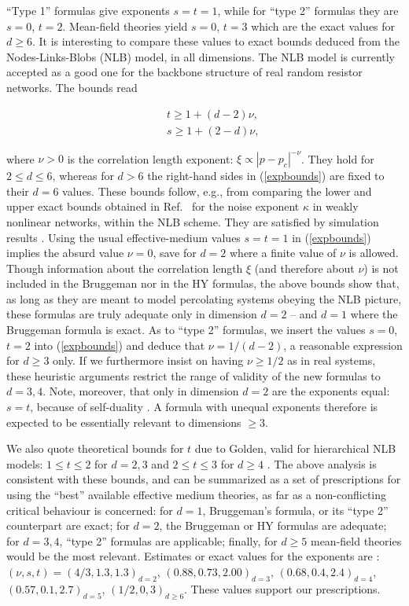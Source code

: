 ``Type 1'' formulas give exponents $s=t=1$, while for ``type 2''
formulas they are $s=0$, $t=2$. Mean-field theories yield $s=0$, $t=3$
which are the exact values for $d\geq 6$. It is interesting to
compare these values to exact bounds deduced from the
Nodes-Links-Blobs (NLB) model, in all dimensions. The NLB model is
currently accepted as a good one for the backbone structure of real
random resistor networks\cite{STAU92}. The bounds read
\begin{mathletters}
\label{expbounds}
\begin{eqnarray}
&&t\ge 1+(d-2)\nu,\\
&&s\ge 1+(2-d)\nu,
\end{eqnarray}
\end{mathletters}
where $\nu>0$ is the correlation length exponent: $\xi\propto
|p-p_c|^{-\nu}$. They hold for $2\leq d\leq 6$, whereas for $d>6$ the
right-hand sides in (\ref{expbounds}) are fixed to their $d=6$
values. These bounds follow, e.g., from comparing the lower and upper
exact bounds obtained in Ref.\ \cite{WRIG86} for the noise exponent
$\kappa$ in weakly nonlinear networks, within the NLB scheme. They
are satisfied by simulation results \cite{WRIG86}.
Using the usual
effective-medium values $s=t=1$ in (\ref{expbounds}) implies the
absurd value $\nu=0$, save for $d=2$ where a finite value of $\nu$ is
allowed. Though information about the correlation length $\xi$ (and
therefore about $\nu$) is not included in the Bruggeman nor in the HY
formulas, the above bounds show that, as long as they are meant to
model percolating systems obeying the NLB picture, these formulas are
truly adequate only in dimension $d=2$ -- and $d=1$ where the Bruggeman
formula is exact. As to ``type 2'' formulas, we insert the
values $s=0$, $t=2$ into (\ref{expbounds}) and deduce that
$\nu=1/(d-2)$, a reasonable expression for $d\geq 3$ only. If we
furthermore insist on having $\nu\geq 1/2$ as in real systems, these
heuristic arguments restrict the range of validity of the new formulas
to $d=3,4$. Note, moreover, that only in dimension $d=2$ are the
exponents equal: $s=t$, because of self-duality \cite{STRA77}. A
formula with unequal exponents therefore is expected to be essentially
relevant to dimensions $\geq 3$.

We also quote theoretical bounds for $t$ due to Golden, valid for
hierarchical NLB models: $1\leq t\leq 2$ for $d=2,3$ and $2\leq t\leq
3$ for $d\geq 4$ \cite{GOLD90}. The above analysis is consistent with
these bounds, and can be summarized as a set of prescriptions for
using the ``best'' available effective medium theories, as far as a
non-conflicting critical behaviour is concerned: for $d=1$,
Bruggeman's formula, or its ``type 2'' counterpart are exact; for
$d=2$, the Bruggeman or HY formulas are adequate; for $d=3,4$, ``type
2'' formulas are applicable; finally, for $d\geq 5$ mean-field
theories would be the most relevant. Estimates or exact values for
the exponents are \cite{STAU92}: $(\nu,s,t)=(4/3,1.3,1.3)_{d=2}$,
$(0.88,0.73,2.00)_{d=3}$, $(0.68,0.4,2.4)_{d=4}$,
$(0.57,0.1,2.7)_{d=5}$, $(1/2,0,3)_{d\geq 6}$. These values support
our prescriptions.


